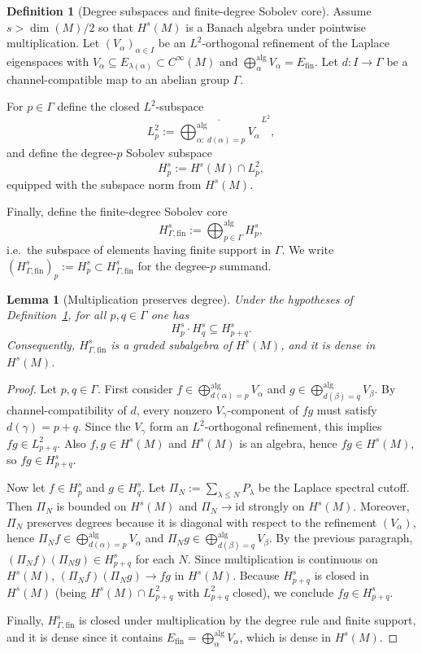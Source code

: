 \documentclass[11pt]{amsart}
\theoremstyle{plain}
\newtheorem{lemma}[theorem]{Lemma}
\theoremstyle{definition}
\newtheorem{definition}[theorem]{Definition}
\theoremstyle{remark}
\begin{document}
\begin{definition}[Degree subspaces and finite-degree Sobolev core]\label{def:Hs-degree-core}
Assume $s>\dim(M)/2$ so that $H^s(M)$ is a Banach algebra under pointwise multiplication.
Let $(V_\alpha)_{\alpha\in I}$ be an $L^2$-orthogonal refinement of the Laplace eigenspaces with
$V_\alpha\subseteq E_{\lambda(\alpha)}\subset C^\infty(M)$ and $\bigoplus_{\alpha}^{\mathrm{alg}}V_\alpha=E_{\mathrm{fin}}$.
Let $d:I\to\Gamma$ be a channel-compatible map to an abelian group $\Gamma$.

For $p\in\Gamma$ define the closed $L^2$-subspace
\[
L^2_p:=\overline{\bigoplus_{\alpha:\ d(\alpha)=p}^{\mathrm{alg}}V_\alpha}^{\,L^2},
\]
and define the degree-$p$ Sobolev subspace
\[
H^s_p:=H^s(M)\cap L^2_p,
\]
equipped with the subspace norm from $H^s(M)$.

Finally, define the finite-degree Sobolev core
\[
H^s_{\Gamma,\mathrm{fin}}:=\bigoplus_{p\in\Gamma}^{\mathrm{alg}}H^s_p,
\]
i.e.\ the subspace of elements having finite support in $\Gamma$. We write $(H^s_{\Gamma,\mathrm{fin}})_p:=H^s_p\subset H^s_{\Gamma,\mathrm{fin}}$ for the degree-$p$ summand.
\end{definition}

\begin{lemma}[Multiplication preserves degree]\label{lem:Hs-degree-multiplication}
Under the hypotheses of Definition~\ref{def:Hs-degree-core}, for all $p,q\in\Gamma$ one has
\[
H^s_p\cdot H^s_q \subseteq H^s_{p+q}.
\]
Consequently, $H^s_{\Gamma,\mathrm{fin}}$ is a graded subalgebra of $H^s(M)$, and it is dense in $H^s(M)$.
\end{lemma}

\begin{proof}
Let $p,q\in\Gamma$.
First consider $f\in \bigoplus_{d(\alpha)=p}^{\mathrm{alg}}V_\alpha$ and
$g\in \bigoplus_{d(\beta)=q}^{\mathrm{alg}}V_\beta$.
By channel-compatibility of $d$, every nonzero $V_\gamma$-component of $fg$ must satisfy $d(\gamma)=p+q$.
Since the $V_\gamma$ form an $L^2$-orthogonal refinement, this implies $fg\in L^2_{p+q}$.
Also $f,g\in H^s(M)$ and $H^s(M)$ is an algebra, hence $fg\in H^s(M)$, so $fg\in H^s_{p+q}$.

Now let $f\in H^s_p$ and $g\in H^s_q$.
Let $\Pi_N:=\sum_{\lambda\le N}P_\lambda$ be the Laplace spectral cutoff.
Then $\Pi_N$ is bounded on $H^s(M)$ and $\Pi_N\to \mathrm{id}$ strongly on $H^s(M)$.
Moreover, $\Pi_N$ preserves degrees because it is diagonal with respect to the refinement $(V_\alpha)$, hence
$\Pi_N f \in \bigoplus_{d(\alpha)=p}^{\mathrm{alg}}V_\alpha$ and
$\Pi_N g \in \bigoplus_{d(\beta)=q}^{\mathrm{alg}}V_\beta$.
By the previous paragraph, $(\Pi_N f)(\Pi_N g)\in H^s_{p+q}$ for each $N$.
Since multiplication is continuous on $H^s(M)$, $(\Pi_N f)(\Pi_N g)\to fg$ in $H^s(M)$.
Because $H^s_{p+q}$ is closed in $H^s(M)$ (being $H^s(M)\cap L^2_{p+q}$ with $L^2_{p+q}$ closed),
we conclude $fg\in H^s_{p+q}$.

Finally, $H^s_{\Gamma,\mathrm{fin}}$ is closed under multiplication by the degree rule and finite support,
and it is dense since it contains $E_{\mathrm{fin}}=\bigoplus_\alpha^{\mathrm{alg}}V_\alpha$, which is dense in $H^s(M)$.
\end{proof}
\end{document}

